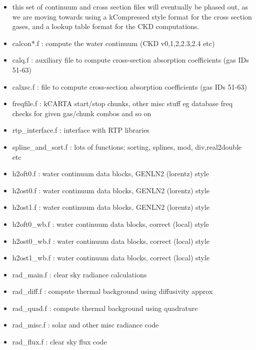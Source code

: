 \documentclass[12pt]{article}
\begin{document}
\begin{itemize}
\item this set of continuum and cross section files will eventually be phased
out, as we are moving towards using a kCompressed style format for the 
cross section gases, and a lookup table format for the CKD computations.
\item {\sf calcon*.f} : compute the water continuum (CKD v0,1,2,2.3,2.4 etc)
\item {\sf calq.f}    : auxiliary file to compute cross-section absorption 
                        coefficients (gas IDs 51-63)
\item {\sf calxsc.f}  : file to compute cross-section absorption 
                        coefficients (gas IDs 51-63)

\item {\sf freqfile.f}        : kCARTA start/stop chunks, other misc stuff
                                eg database freq checks for given gas/chunk
                                combos and so on
\item {\sf rtp\_interface.f}   : interface with RTP libraries
\item {\sf spline\_and\_sort.f} : lots of functions; sorting, splines, mod, 
                                  div,real2double etc

\item {\sf h2oft0.f} : water continuum data blocks, GENLN2 (lorentz) style
\item {\sf h2ost0.f} : water continuum data blocks, GENLN2 (lorentz) style
\item {\sf h2ost1.f} : water continuum data blocks, GENLN2 (lorentz) style
\item {\sf h2oft0\_wb.f} : water continuum data blocks, correct (local) style
\item {\sf h2ost0\_wb.f} : water continuum data blocks, correct (local) style
\item {\sf h2ost1\_wb.f} : water continuum data blocks, correct (local) style

\item {\sf rad\_main.f} : clear sky radiance calculations
\item {\sf rad\_diff.f} : compute thermal background using diffusivity approx
\item {\sf rad\_quad.f} : compute thermal background using quadrature
\item {\sf rad\_misc.f} : solar and other misc radiance code
\item {\sf rad\_flux.f} : clear sky flux code


\end{itemize}
\end{document}
